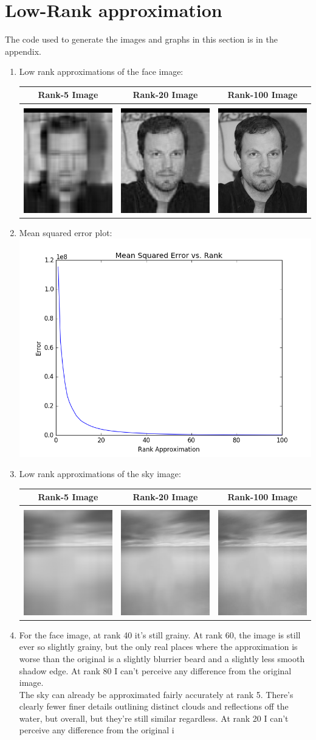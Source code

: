 \documentclass{article}
\begin{document}
\newpage

\section*{Low-Rank approximation}
The code used to generate the images and graphs in this section is in the appendix.
\begin{enumerate}[label=\alph*)]
\item Low rank approximations of the face image:

\begin{tabular}{|c|c|c|}
\hline
\textbf{Rank-5 Image} & \textbf{Rank-20 Image} & \textbf{Rank-100 Image} \\
\hline
\phantom{} & \phantom{} & \phantom{} \\
\includegraphics[scale=.45]{images/low-rank_approx/face-5.png} & \includegraphics[scale=.45]{images/low-rank_approx/face-20.png} & \includegraphics[scale=.45]{images/low-rank_approx/face-100.png} \\
\hline
\end{tabular}
\item
Mean squared error plot:\\
\includegraphics[scale=.7]{images/low-rank-MSE.png}
\newpage
\item Low rank approximations of the sky image:

\begin{tabular}{|c|c|c|}
\hline
\textbf{Rank-5 Image} & \textbf{Rank-20 Image} & \textbf{Rank-100 Image} \\
\hline
\phantom{} & \phantom{} & \phantom{} \\
\includegraphics[scale=.45]{images/low-rank_approx/sky-5.png} & \includegraphics[scale=.45]{images/low-rank_approx/sky-20.png} & \includegraphics[scale=.45]{images/low-rank_approx/sky-100.png} \\
\hline
\end{tabular}
\item For the face image, at rank 40 it's still grainy. At rank 60, the image is still ever so slightly grainy, but the only real places where the approximation is worse than the original is a slightly blurrier beard and a slightly less smooth shadow edge. At rank 80 I can't perceive any difference from the original image.\\

The sky can already be approximated fairly accurately at rank 5. There's clearly fewer finer details outlining distinct clouds and reflections off the water, but overall, but they're still similar regardless. At rank 20 I can't perceive any difference from the original i
\end{enumerate}
\end{document}
